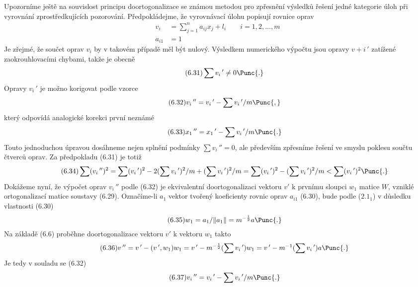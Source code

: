  Upozorníme ještě na souvislost principu doortogonalizace se
známou metodou pro zpřesnění výsledků řešení jedné kategorie úloh
při vyrovnání zprostředkujících pozorování.  Předpokládejme, že
vyrovnávací úlohu popisují rovnice oprav
%
\begin{align*}
  \tag{6.29}  v_i   &= \sum_{j=1}^{n} a_{ij} x_j + l_i \qquad  i=1,2,\dots,m \\
  \tag{6.30}  a_{i1} &= 1
\end{align*}
%
Je zřejmé, že součet oprav $v_i$ by v takovém případě měl být
nulový. Výsledkem numerického výpočtu jsou opravy $v+i\,'$ zatížené
zaokrouhlovacími chybami, takže je obecně
%
\begin{align*}
  \tag{6.31}  \sum v_i\,' \ne 0 \Punc{.}
\end{align*}
%
Opravy $v_i\,'$ je možno korigovat podle vzorce
%
\begin{align*}
  \tag{6.32} v_i\,'' = v_i\,' - \sum v_i\,'/m  \Punc{,}
\end{align*}
%
který odpovídá analogické korekci první neznámé
%
\begin{align*}
\tag{6.33}   x_1\,'' = x_1\,' - \sum v_i\,' / m \Punc{.}
\end{align*}
%
Touto jednoduchou úpravou dosáhneme nejen splnění podmínky $\sum
v_i\,'' = 0$, ale především zpřesníme řešení ve smyslu poklesu
součtu čtverců oprav. Za předpokladu (6.31) je totiž
%
\begin{align*}
  \tag{6.34}
  \sum (v_i\,'')^2 = \sum (v_i\,')^2
  -2(\sum v_i\,')^2/m + (\sum v_i\,')^2/m
  = \sum (v_i\,')^2 -(\sum v_i\,')^2/m < \sum(v_i\,')^2 \Punc{.}
\end{align*}
%
Dokážeme nyní, že výpočet oprav $v_i\,''$ podle (6.32) je ekvivalentní
doortogonalizaci vektoru $v'$ k prvnímu sloupci $w_1$ matice $W$,
vzniklé ortogonalizací matice soustavy (6.29). Označíme-li $a_1$
vektor tvořený koeficienty rovnic oprav $a_{i1}$ (6.30), bude podle
($2.1_1$) v důsledku vlastnosti (6.30)
%
\begin{align*}
  \tag{6.35}
  w_1 = a_1/\Vert a_1\Vert = m^{-{1\over2}}a \Punc{.}
\end{align*}
%
Na základě (6.6) proběhne doortogonalizace vektoru $v'$ k vektoru
$w_1$ takto 
%
\begin{align*}
  \tag{6.36}
  v\,'' = v\,' - (v\,',w_1)w_1 = v\,' - m^{-{1\over2}}(\sum v_i\,')w_1
  = v\,' - m^{-1}(\sum v_i\,')a \Punc{.}
\end{align*}
%
Je tedy v souladu se (6.32)
%
\begin{align*}
  \tag{6.37}
  v_i\,'' = v_i\,' - \sum v_i\,'/m \Punc{.}
\end{align*}

